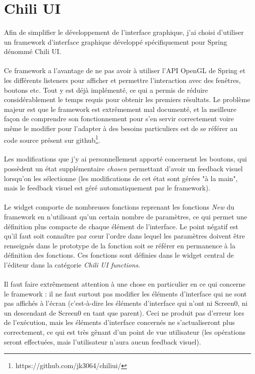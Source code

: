 \documentclass[a4paper]{article}
\begin{document}
\section{Chili UI} \label{chili}
\paragraph{}
Afin de simplifier le développement de l'interface graphique, j'ai choisi d'utiliser un framework d'interface graphique développé spécifiquement pour Spring dénommé Chili UI. 
\paragraph{}
Ce framework a l'avantage de ne pas avoir à utiliser l'API OpenGL de Spring et les différents listeners pour afficher et permettre l'interaction avec des fenêtres, boutons etc. Tout y est déjà implémenté, ce qui a permis de réduire considérablement le temps requis pour obtenir les premiers résultats. Le problème majeur est que le framework est extrêmement mal documenté, et la meilleure façon de comprendre son fonctionnement pour s'en servir correctement voire même le modifier pour l'adapter à des besoins particuliers est de se référer au code source présent sur github\footnote{https://github.com/jk3064/chiliui/}.
\paragraph{}
Les modifications que j'y ai personnellement apporté concernent les boutons, qui possèdent un état supplémentaire \textit{chosen} permettant d'avoir un feedback visuel lorsqu'on les sélectionne (les modifications de cet état sont gérées "à la main", mais le feedback visuel est géré automatiquement par le framework).
\paragraph{}
Le widget comporte de nombreuses fonctions reprenant les fonctions \textit{New} du framework en n'utilisant qu'un certain nombre de paramètres, ce qui permet une définition plus compacte de chaque élément de l'interface. Le point négatif est qu'il faut soit connaître par cœur l'ordre dans lequel les paramètres doivent être renseignés dans le prototype de la fonction soit se référer en permanence à la définition des fonctions. Ces fonctions sont définies dans le widget central de l'éditeur dans la catégorie \textit{Chili UI functions}.
\paragraph{}
Il faut faire extrêmement attention à une chose en particulier en ce qui concerne le framework : il ne faut surtout pas modifier les éléments d'interface qui ne sont pas affichés à l'écran (c'est-à-dire les éléments d'interface qui n'ont ni Screen0, ni un descendant de Screen0 en tant que parent). Ceci ne produit pas d'erreur lors de l'exécution, mais les éléments d'interface concernés ne s'actualiseront plus correctement, ce qui est très gênant d'un point de vue utilisateur (les opérations seront effectuées, mais l'utilisateur n'aura aucun feedback visuel).
\end{document}
